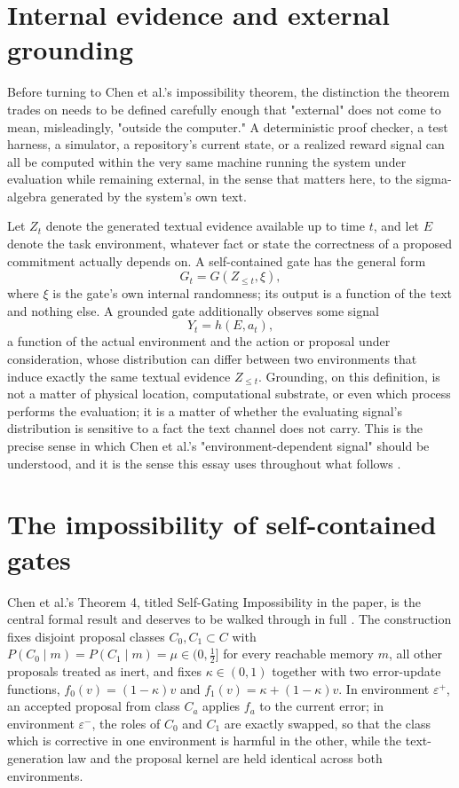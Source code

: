 \documentclass[11pt]{article}
\begin{document}
\section{Internal evidence and external grounding}

Before turning to Chen et al.'s impossibility theorem, the distinction the theorem trades on needs to be defined carefully enough that "external" does not come to mean, misleadingly, "outside the computer." A deterministic proof checker, a test harness, a simulator, a repository's current state, or a realized reward signal can all be computed within the very same machine running the system under evaluation while remaining external, in the sense that matters here, to the sigma-algebra generated by the system's own text.

Let $Z_t$ denote the generated textual evidence available up to time $t$, and let $E$ denote the task environment, whatever fact or state the correctness of a proposed commitment actually depends on. A self-contained gate has the general form
$$G_t = G(Z_{\le t}, \xi),$$
where $\xi$ is the gate's own internal randomness; its output is a function of the text and nothing else. A grounded gate additionally observes some signal
$$Y_t = h(E, a_t),$$
a function of the actual environment and the action or proposal under consideration, whose distribution can differ between two environments that induce exactly the same textual evidence $Z_{\le t}$. Grounding, on this definition, is not a matter of physical location, computational substrate, or even which process performs the evaluation; it is a matter of whether the evaluating signal's distribution is sensitive to a fact the text channel does not carry. This is the precise sense in which Chen et al.'s "environment-dependent signal" should be understood, and it is the sense this essay uses throughout what follows \cite{chen2026bilevel}.

\section{The impossibility of self-contained gates}

Chen et al.'s Theorem 4, titled Self-Gating Impossibility in the paper, is the central formal result and deserves to be walked through in full \cite{chen2026bilevel}. The construction fixes disjoint proposal classes $C_0, C_1 \subset C$ with $P(C_0 \mid m) = P(C_1 \mid m) = \mu \in (0, \tfrac{1}{2}]$ for every reachable memory $m$, all other proposals treated as inert, and fixes $\kappa \in (0,1)$ together with two error-update functions, $f_0(v) = (1-\kappa)v$ and $f_1(v) = \kappa + (1-\kappa)v$. In environment $\varepsilon^+$, an accepted proposal from class $C_a$ applies $f_a$ to the current error; in environment $\varepsilon^-$, the roles of $C_0$ and $C_1$ are exactly swapped, so that the class which is corrective in one environment is harmful in the other, while the text-generation law and the proposal kernel are held identical across both environments.
\end{document}
